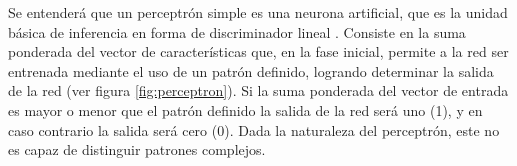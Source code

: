 Se entenderá que un perceptrón simple es una neurona artificial, que es la unidad básica de inferencia en forma de discriminador lineal \cite{Cruz2011}. Consiste en la suma ponderada del vector de características que, en la fase inicial, permite a la red ser entrenada mediante el uso de un patrón definido, logrando determinar la salida de la red (ver figura \ref{fig:perceptron}). Si la suma ponderada del vector de entrada es mayor o menor que el patrón definido la salida de la red será uno (1), y en caso contrario la salida será cero (0). Dada la naturaleza del perceptrón, este no es capaz de distinguir patrones complejos.

